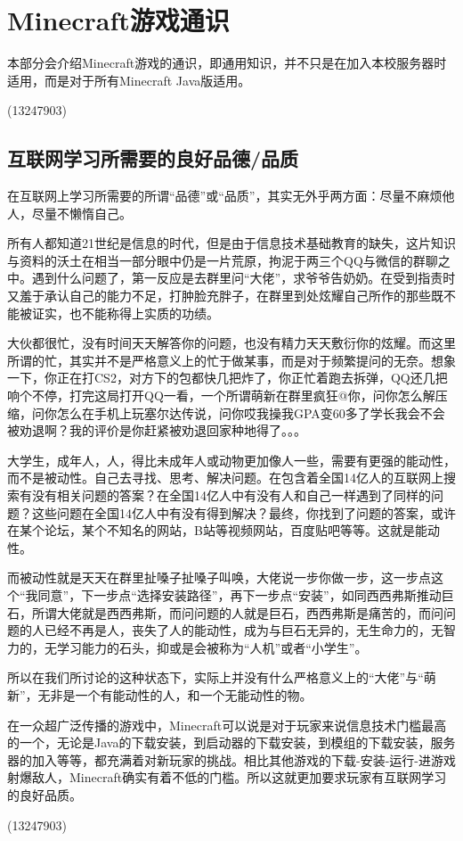 \documentclass[UTF8,a4paper]{article}
\begin{document}
	\section{Minecraft游戏通识}
		\par 本部分会介绍Minecraft游戏的通识，即通用知识，并不只是在加入本校服务器时适用，而是对于所有Minecraft Java版适用。
		\begin{flushright}(13247903)\end{flushright}
		\subsection{互联网学习所需要的良好品德/品质}
			\par 在互联网上学习所需要的所谓“品德”或“品质”，其实无外乎两方面：尽量不麻烦他人，尽量不懒惰自己。
			\par 所有人都知道21世纪是信息的时代，但是由于信息技术基础教育的缺失，这片知识与资料的沃土在相当一部分眼中仍是一片荒原，拘泥于两三个QQ与微信的群聊之中。遇到什么问题了，第一反应是去群里问“大佬”，求爷爷告奶奶。在受到指责时又羞于承认自己的能力不足，打肿脸充胖子，在群里到处炫耀自己所作的那些既不能被证实，也不能称得上实质的功绩。
			\par 大伙都很忙，没有时间天天解答你的问题，也没有精力天天敷衍你的炫耀。而这里所谓的忙，其实并不是严格意义上的忙于做某事，而是对于频繁提问的无奈。想象一下，你正在打CS2，对方下的包都快几把炸了，你正忙着跑去拆弹，QQ还几把响个不停，打完这局打开QQ一看，一个所谓萌新在群里疯狂@你，问你怎么解压缩，问你怎么在手机上玩塞尔达传说，问你哎我操我GPA变60多了学长我会不会被劝退啊？我的评价是你赶紧被劝退回家种地得了。。。
			\par 大学生，成年人，人，得比未成年人或动物更加像人一些，需要有更强的能动性，而不是被动性。自己去寻找、思考、解决问题。在包含着全国14亿人的互联网上搜索有没有相关问题的答案？在全国14亿人中有没有人和自己一样遇到了同样的问题？这些问题在全国14亿人中有没有得到解决？最终，你找到了问题的答案，或许在某个论坛，某个不知名的网站，B站等视频网站，百度贴吧等等。这就是能动性。
			\par 而被动性就是天天在群里扯嗓子扯嗓子叫唤，大佬说一步你做一步，这一步点这个“我同意”，下一步点“选择安装路径”，再下一步点“安装”，如同西西弗斯推动巨石，所谓大佬就是西西弗斯，而问问题的人就是巨石，西西弗斯是痛苦的，而问问题的人已经不再是人，丧失了人的能动性，成为与巨石无异的，无生命力的，无智力的，无学习能力的石头，抑或是会被称为“人机”或者“小学生”。
			\par 所以在我们所讨论的这种状态下，实际上并没有什么严格意义上的“大佬”与“萌新”，无非是一个有能动性的人，和一个无能动性的物。
			\par 在一众超广泛传播的游戏中，Minecraft可以说是对于玩家来说信息技术门槛最高的一个，无论是Java的下载安装，到启动器的下载安装，到模组的下载安装，服务器的加入等等，都充满着对新玩家的挑战。相比其他游戏的下载-安装-运行-进游戏射爆敌人，Minecraft确实有着不低的门槛。所以这就更加要求玩家有互联网学习的良好品质。
			\begin{flushright}(13247903)\end{flushright}
\end{document}

